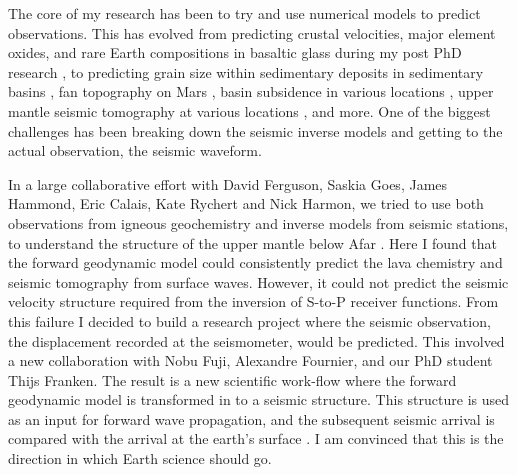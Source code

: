 The core of my research has been to try and use numerical models to predict observations. This has evolved from predicting crustal velocities, major element oxides, and rare Earth compositions in basaltic glass during my post PhD research \citep{armitage-etal-2010,armitage-etal-g3-2011}, to predicting grain size within sedimentary deposits in sedimentary basins \citep[e.g.][]{armitage-etal-ngeo-2011,armitage-etal-2015,armitage-etal-br-2018}, fan topography on Mars \citep{armitage-etal-grl-2011}, basin subsidence in various locations \citep[e.g.][]{armitage-2010,armitage-etal-jgr-2013,petersen-etal-2015}, upper mantle seismic tomography at various locations \citep[e.g.][]{goes-etal-2012,armitage-etal-2015}, and more. One of the biggest challenges has been breaking down the seismic inverse models and getting to the actual observation, the seismic waveform.

In a large collaborative effort with David Ferguson, Saskia Goes, James Hammond, Eric Calais, Kate Rychert and Nick Harmon, we tried to use both observations from igneous geochemistry and inverse models from seismic stations, to understand the structure of the upper mantle below Afar \citep{armitage-etal-epsl-2015}. Here I found that the forward geodynamic model could consistently predict the lava chemistry and seismic tomography from surface waves. However, it could not predict the seismic velocity structure required from the inversion of S-to-P receiver functions. From this failure I decided to build a research project where the seismic observation, the displacement recorded at the seismometer, would be predicted. This involved a new collaboration with Nobu Fuji, Alexandre Fournier, and our PhD student Thijs Franken. The result is a new scientific work-flow where the forward geodynamic model is transformed in to a seismic structure. This structure is used as an input for forward wave propagation, and the subsequent seismic arrival is compared with the arrival at the earth's surface \citep{franken-etal-2020}. I am convinced that this is the direction in which Earth science should go.

